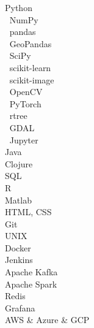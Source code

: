 \fstar \medspace Python\\
$~$ \qquad \fstars NumPy\\
$~$ \qquad \fstars pandas\\
$~$ \qquad \fstars GeoPandas\\
$~$ \qquad \mstars SciPy\\
$~$ \qquad \mstars scikit-learn\\
$~$ \qquad \mstars scikit-image\\
$~$ \qquad \fstars OpenCV\\
$~$ \qquad \mstars PyTorch\\
$~$ \qquad \mstars rtree\\
$~$ \qquad \mstars GDAL\\
$~$ \qquad \fstars Jupyter\\
\mstar \medspace Java\\
\mstar \medspace Clojure\\
\fstar \medspace SQL\\
\fstar \medspace R\\
\fstar \medspace Matlab\\
\mstar \medspace HTML, CSS\\
\mstar \medspace Git\\
\fstar \medspace UNIX\\
\mstar \medspace Docker\\
\mstar \medspace Jenkins\\
\mstar \medspace Apache Kafka\\
\mstar \medspace Apache Spark\\
\mstar \medspace Redis\\
\mstar \medspace Grafana\\
\fstar \medspace AWS \& Azure \& GCP\\
